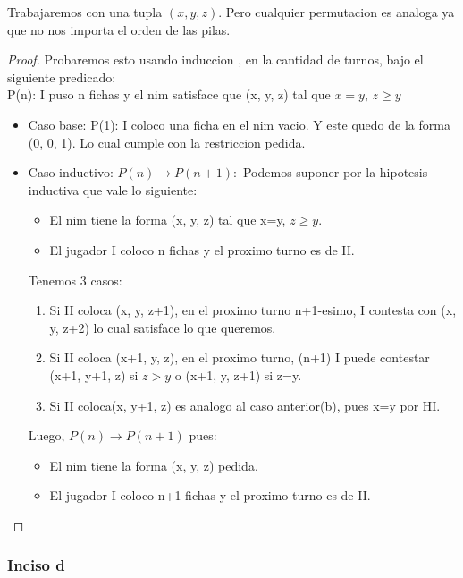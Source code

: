 Trabajaremos con una tupla $(x, y, z)$. Pero cualquier permutacion es analoga ya que no nos importa el orden de las pilas.\\

\begin{proof}
Probaremos esto usando induccion , en la cantidad de turnos, bajo el siguiente predicado:\\
P(n): {I puso n fichas y el nim satisface que (x, y, z) tal que $x = y$, $z \geq y$}\\

\begin{itemize}
	\item Caso base: 
		P(1): I coloco una ficha en el nim vacio. Y este quedo de la forma (0, 0, 1). Lo cual cumple con la restriccion pedida.
	\item Caso inductivo: 
		$P(n) \rightarrow P(n+1):$
		Podemos suponer por la hipotesis inductiva que vale lo siguiente:
		\begin{itemize}
			\item El nim tiene la forma (x, y, z) tal que x=y, $z \geq y$.
			\item El jugador I coloco n fichas y el proximo turno es de II.
		\end{itemize}

		Tenemos 3 casos:
		\begin{enumerate}
			\item Si II coloca (x, y, z+1), en el proximo turno n+1-esimo, I contesta con (x, y, z+2) lo cual satisface lo que queremos.
			\item Si II coloca (x+1, y, z), en el proximo turno, (n+1) I puede contestar (x+1, y+1, z) si $z>y$ o (x+1, y, z+1) si z=y.
			\item Si II coloca(x, y+1, z) es analogo al caso anterior(b), pues x=y por HI.
		\end{enumerate}

		Luego, $P(n) \rightarrow P(n+1)$ pues:
		\begin{itemize}
			\item El nim tiene la forma (x, y, z) pedida.
			\item El jugador I coloco n+1 fichas y el proximo turno es de II.
		\end{itemize}
		
\end{itemize}
\end{proof}

\subsubsection{Inciso d}


